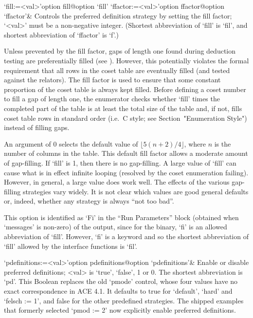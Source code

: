 \beginitems

\>`fill:=<val>'{option fill}@{option `fill'}
\>`ffactor:=<val>'{option ffactor}@{option `ffactor'}&
Controls the preferred definition strategy by setting the fill factor;
`<val>' must be a non-negative integer.
(Shortest abbreviation of `fill' is `fil', and  shortest  abbreviation
of `ffactor' is `f'.)

Unless prevented by the fill factor, gaps of length one  found  during
deduction  testing  are  preferentially   filled   (see \cite{Hav91}).
However, this potentially violates the  formal  requirement  that  all
rows in the coset table are eventually filled (and tested against  the
relators). The fill factor  is  used  to  ensure  that  some  constant
proportion of the coset table is always kept filled. Before defining a
coset number to fill a  gap  of  length  one,  the  enumerator  checks
whether `fill' times the completed part of the table is at  least  the
total size of the table  and,  if  not,  fills  coset  table  rows  in
standard order (i.e.~C style; see Section~"Enumeration Style") instead
of filling gaps.

An  argument of  0  selects  the default  value  of $\lfloor  5(n+2)/4
\rfloor$,  where $n$  is the  number of  columns in  the  table.  This
default  fill factor  allows  a moderate  amount  of gap-filling.   If
`fill' is  1, then there is  no gap-filling.  A large  value of `fill'
can cause  what is in effect  infinite looping (resolved  by the coset
enumeration failing).   However, in general,  a large value  does work
well.  The  effects of the various gap-filling  strategies vary widely.
It is  not clear  which values are  good general defaults  or, indeed,
whether any strategy is always ``not too bad''.

This option is identified as `Fi'  in  the  ``Run  Parameters''  block
(obtained when `messages' is non-zero) of the {\ACE} output, since for
the {\ACE} binary, `fi' is an allowed abbreviation of `fill'. However,
`fi' is a {\GAP} keyword and so the shortest  abbreviation  of  `fill'
allowed by the interface functions is `fil'.

\>`pdefinitions:=<val>'{option pdefinitions}@{option `pdefinitions'}&
Enable or disable preferred definitions; <val> is `true', `false', 1 or 0.
The shortest abbreviation is `pd'. This Boolean replaces the old `pmode'
control, whose four values have no exact correspondence in ACE 4.1.
It defaults to true for `default', `hard' and `felsch := 1', and false
for the other predefined strategies. The shipped examples that formerly
selected `pmod := 2' now explicitly enable preferred definitions.

